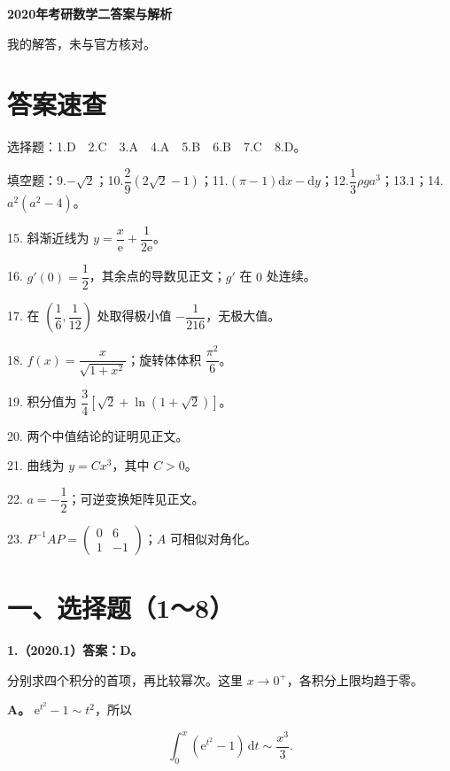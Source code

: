 \documentclass[UTF8,11pt,fontset=windows]{ctexart}
\begin{document}
{\LARGE\bfseries 2020年考研数学二答案与解析\par}\vspace{6pt}

\begingroup\color{gray}我的解答，未与官方核对。\par\endgroup

\section*{答案速查}

\begingroup\color{gray}选择题：1.D　2.C　3.A　4.A　5.B　6.B　7.C　8.D。\par\endgroup

\begingroup\color{gray}填空题：9.$-\sqrt2$；10.$\dfrac29(2\sqrt2-1)$；11.$(\pi-1)\mathrm dx-\mathrm dy$；12.$\dfrac13\rho ga^3$；13.$1$；14.$a^2(a^2-4)$。\par\endgroup

15. 斜渐近线为 $y=\dfrac{x}{\mathrm e}+\dfrac1{2\mathrm e}$。

16. $g'(0)=\dfrac12$，其余点的导数见正文；$g'$ 在 $0$ 处连续。

17. 在 $(\dfrac16,\dfrac1{12})$ 处取得极小值 $-\dfrac1{216}$，无极大值。

18. $f(x)=\dfrac{x}{\sqrt{1+x^2}}$；旋转体体积 $\dfrac{\pi^2}{6}$。

19. 积分值为 $\dfrac34[\sqrt2+\ln(1+\sqrt2)]$。

20. 两个中值结论的证明见正文。

21. 曲线为 $y=Cx^3$，其中 $C>0$。

22. $a=-\dfrac12$；可逆变换矩阵见正文。

23. $P^{-1}AP=\begin{pmatrix}0&6\\1&-1\end{pmatrix}$；$A$ 可相似对角化。

\clearpage

\section*{一、选择题（1～8）}

\textbf{1.（2020.1）答案：D。}

分别求四个积分的首项，再比较幂次。这里 $x\to0^+$，各积分上限均趋于零。

\textbf{A。} $\mathrm e^{t^2}-1\sim t^2$，所以

$$
\int_0^x(\mathrm e^{t^2}-1)\,\mathrm dt\sim\frac{x^3}{3}.
$$
\end{document}
